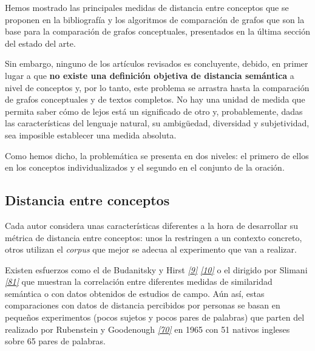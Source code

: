 \documentclass[a4paper,12pt,spanish]{book}
\begin{document}
Hemos mostrado las principales medidas de distancia entre conceptos que se
proponen en la bibliografía y los algoritmos de comparación de grafos que son la base
para la comparación de grafos conceptuales, presentados en la última sección del
estado del arte.

Sin embargo, ninguno de los artículos revisados es concluyente, debido, en primer lugar
a que \textbf{no existe una definición objetiva de distancia semántica} a nivel de conceptos y,
por lo tanto, este problema se arrastra hasta la comparación de grafos conceptuales y de
textos completos. No hay una unidad de medida que permita saber cómo de lejos está
un significado de otro y, probablemente, dadas las características del lenguaje natural,
su ambigüedad, diversidad y subjetividad, sea imposible establecer una medida absoluta.

Como hemos dicho, la problemática se presenta en dos niveles: el primero de ellos en
los conceptos individualizados y el segundo en el conjunto de la oración.


\subsection{Distancia entre conceptos}
\label{2.problem/index:distancia-entre-conceptos}
Cada autor considera unas características diferentes a la hora de desarrollar su métrica
de distancia entre conceptos: unos la restringen a un contexto concreto, otros utilizan el
\emph{corpus} que mejor se adecua al experimento que van a realizar.

Existen esfuerzos como el de Budanitsky y Hirst \label{2.problem/index:id1}{\hyperref[zreferences:budanitsky1998]{\emph{{[}9{]}}}} \label{2.problem/index:id2}{\hyperref[zreferences:budanitsky2006]{\emph{{[}10{]}}}}
o el dirigido por Slimani \label{2.problem/index:id3}{\hyperref[zreferences:slimani2013]{\emph{{[}81{]}}}} que muestran la correlación entre diferentes
medidas de similaridad semántica o con datos obtenidos de estudios de campo.
Aún así, estas comparaciones con datos de distancia percibidos por
personas se basan en pequeños experimentos (pocos sujetos y pocos pares de palabras) que
parten del realizado por Rubenstein y Goodenough \label{2.problem/index:id4}{\hyperref[zreferences:rubenstein1965]{\emph{{[}70{]}}}} en 1965 con 51 nativos
ingleses sobre 65 pares de palabras.
\end{document}
